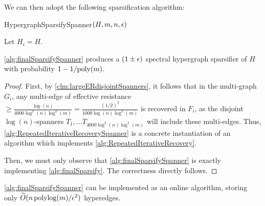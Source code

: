 \documentclass{article}
\begin{document}
We can then adopt the following sparsification algorithm:

\begin{algorithm}[H]
\caption{HypergraphSparsifySpanner$(H, m, n , \epsilon)$}
\label{alg:finalSparsifySpanner}
Let $H_i = H$. \\
\end{algorithm}

\begin{claim}\label{clm:onlineCorrect}
    \cref{alg:finalSparsifySpanner} produces a $(1 \pm \epsilon)$ spectral hypergraph sparsifier of $H$ with probability $1 - 1 / \mathrm{poly}(m)$.
\end{claim}

\begin{proof}
    First, by \cref{clm:largeERdisjointSpanners}, it follows that in the multi-graph $G_i$, any multi-edge of effective resistance $\geq \frac{\log(n)}{4000 \log^2(n)\log^2(m)} = \frac{(1/2)^2}{1000 \log(n)\log^2(m)}$ is recovered in $F_i$, as the disjoint $\log(n)$-spanners $T_1, \dots T_{4000 \log^2(n)\log^2(m)}$ will include these multi-edges. Thus, \cref{alg:RepeatedIterativeRecoverySpanner} is a concrete instantiation of an algorithm which implements \cref{alg:RepeatedIterativeRecovery}.

    Then, we must only observe that \cref{alg:finalSparsifySpanner} is exactly implementing \cref{alg:finalSparsify}. The correctness directly follows. 
\end{proof}

\begin{claim}\label{clm:onlineSize}
    \cref{alg:finalSparsifySpanner} can be implemented as an online algorithm, storing only $\widetilde{O}(n \operatorname{polylog}(m) / \epsilon^2)$ hyperedges. 
\end{claim}
\end{document}
